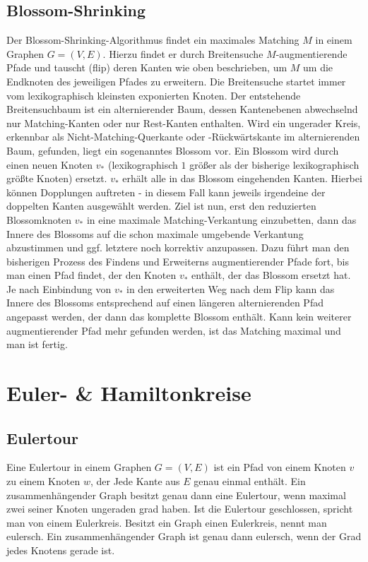 \documentclass[10pt,a4paper,landscape]{article}
\begin{document}
\begin{multicols*}{2}
    \subsection*{ Blossom-Shrinking }
    Der Blossom-Shrinking-Algorithmus findet ein maximales Matching $M$ in einem Graphen $G=(V,E)$. Hierzu findet er durch Breitensuche $M$-augmentierende Pfade 
    und tauscht (flip) deren Kanten wie oben beschrieben, um $M$ um die Endknoten des jeweiligen Pfades zu erweitern.
    \newline
    Die Breitensuche startet immer vom lexikographisch kleinsten exponierten Knoten. Der entstehende Breitensuchbaum ist ein alternierender Baum, 
    dessen Kantenebenen abwechselnd nur Matching-Kanten oder nur Rest-Kanten enthalten.
    \newline
    Wird ein ungerader Kreis, erkennbar als Nicht-Matching-Querkante oder -Rückwärtskante im alternierenden Baum, gefunden, liegt ein sogenanntes Blossom vor. Ein Blossom wird durch einen 
    neuen Knoten $v_*$ (lexikographisch $1$ größer als der bisherige lexikographisch größte Knoten) ersetzt. $v_*$ erhält alle in das Blossom eingehenden Kanten. 
    Hierbei können Dopplungen auftreten - in diesem Fall kann jeweils irgendeine der doppelten Kanten ausgewählt werden.
    \newline
    Ziel ist nun, erst den reduzierten Blossomknoten $v_*$ in eine maximale Matching-Verkantung einzubetten, dann das Innere des Blossoms auf die schon maximale
    umgebende Verkantung abzustimmen und ggf. letztere noch korrektiv anzupassen. Dazu führt man den bisherigen Prozess des Findens und Erweiterns augmentierender 
    Pfade fort, bis man einen Pfad findet, der den Knoten $v_*$ enthält, der das Blossom ersetzt hat. Je nach Einbindung von $v_*$ in den erweiterten Weg nach 
    dem Flip kann das Innere des Blossoms entsprechend auf einen längeren alternierenden Pfad angepasst werden, der dann das komplette Blossom enthält.
    \newline
    Kann kein weiterer augmentierender Pfad mehr gefunden werden, ist das Matching maximal und man ist fertig.

\section{ Euler- \& Hamiltonkreise }
    \subsection*{ Eulertour }
    Eine Eulertour in einem Graphen $G = (V,E)$ ist ein Pfad von einem Knoten $v$ zu einem Knoten $w$, der Jede Kante aus $E$ genau einmal enthält. 
    Ein zusammenhängender Graph besitzt genau dann eine Eulertour, wenn maximal zwei seiner Knoten ungeraden grad haben.
    \newline
    Ist die Eulertour geschlossen, spricht man von einem Eulerkreis. Besitzt ein Graph einen Eulerkreis, nennt man eulersch. Ein zusammenhängender Graph ist 
    genau dann eulersch, wenn der Grad jedes Knotens gerade ist.


\end{multicols*}
\end{document}
